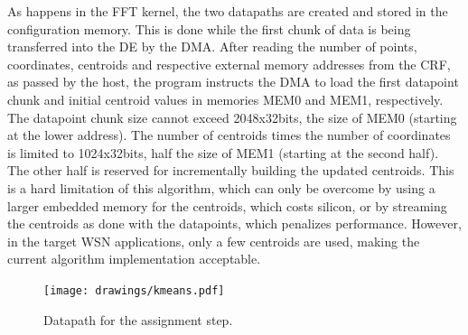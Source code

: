 As happens in the FFT kernel, the two datapaths are created and stored
in the configuration memory. This is done while the first chunk of
data is being transferred into the DE by the DMA. After reading the
number of points, coordinates, centroids and respective external
memory addresses from the CRF, as passed by the host, the program
instructs the DMA to load the first datapoint chunk and initial
centroid values in memories MEM0 and MEM1, respectively. The datapoint
chunk size cannot exceed 2048x32bits, the size of MEM0 (starting at
the lower address). The number of centroids times the number of
coordinates is limited to 1024x32bits, half the size of MEM1 (starting
at the second half). The other half is reserved for incrementally
building the updated centroids. This is a hard limitation of this
algorithm, which can only be overcome by using a larger embedded
memory for the centroids, which costs silicon, or by streaming the
centroids as done with the datapoints, which penalizes
performance. However, in the target WSN applications, only a few
centroids are used, making the current algorithm implementation
acceptable.

\begin{figure}[!htb]
\centering \texttt{[image: drawings/kmeans.pdf]}
\caption{Datapath for the assignment step.}
\label{fig:assignment}
\end{figure}

